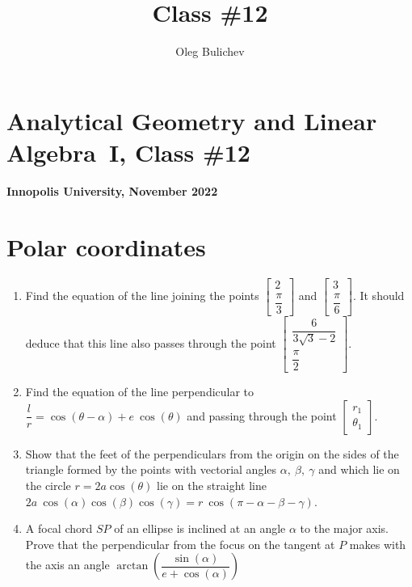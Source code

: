 \documentclass[a4paper,10pt]{article}
\title{Class \#12}
\author{Oleg Bulichev}
\date{}
\begin{document}
\section*{Analytical Geometry and Linear Algebra~I, Class \#12}
\noindent\textbf{Innopolis University, November 2022}
\section{Polar coordinates}
\begin{enumerate}

\item Find the equation of the line joining the points $\begin{bmatrix} 2 \\ \dfrac{\pi}{3} \end{bmatrix}$ and $\begin{bmatrix} 3 \\ \dfrac{\pi}{6} \end{bmatrix}$. It should deduce that this line also passes through the point $\begin{bmatrix} \dfrac{6}{3\sqrt{3}-2} \\ \dfrac{\pi}{2} \end{bmatrix}$.

\item Find the equation of the line perpendicular to $\dfrac{l}{r}=\cos(\theta-\alpha)+e\ \cos(\theta) $ and passing through the point $\begin{bmatrix} r_1 \\ \theta_1\end{bmatrix}$.


\item Show that the feet of the perpendiculars from the origin on the sides of the triangle formed by the points with vectorial angles $\alpha,\ \beta,\ \gamma$ and which lie on the circle $r = 2a \cos(\theta)$ lie on the straight line $2a\ \cos(\alpha) \cos(\beta) \cos (\gamma) = r\ \cos(\pi - \alpha - \beta - \gamma)$.

\item A focal chord $SP$ of an ellipse is inclined at an angle $\alpha$ to the major axis. Prove that the perpendicular from the focus on the tangent at $P$ makes with the axis an angle $\arctan(\dfrac{\sin(\alpha)}{e+\cos(\alpha)})$

\end{enumerate}
\end{document}
